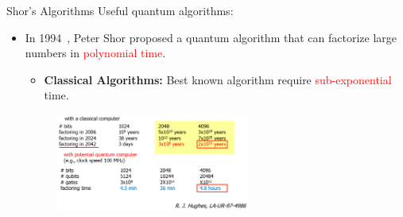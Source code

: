 \documentclass[10pt]{beamer}
\begin{document}
\begin{CJK}{UTF8}{gbsn}
{%



}


\begin{frame}[fragile]{Shor's Algorithms}
  Useful quantum algorithms:
  \begin{itemize}
    \item In 1994~, Peter Shor proposed a quantum algorithm that can factorize large numbers in \textcolor{red}{polynomial time}.
    \begin{itemize}
      \item \textbf{Classical Algorithms:} Best known algorithm require \textcolor{red}{sub-exponential} time.
    \end{itemize}

    \vspace{1em}
    \begin{figure}
      \centering
      \includegraphics[width=0.6\textwidth]{fig/shor.png}
    \end{figure}
  \end{itemize}
\end{frame}
\end{CJK}
\end{document}
